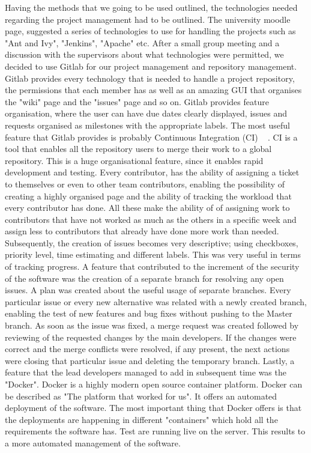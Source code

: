 \documentclass{l3proj}
\begin{document}
Having the methods that we going to be used outlined, the technologies needed regarding the project management had to be outlined. The university moodle page, suggested a series of technologies to use for handling the projects such as "Ant and Ivy", "Jenkins", "Apache" etc. After a small group meeting and a discussion with the supervisors about what technologies were permitted, we decided to use Gitlab for our project management and repository management. Gitlab provides every technology that is needed to handle a project repository, the permissions that each member has as well as an amazing GUI that organises the "wiki" page and the "issues" page and so on. Gitlab provides feature organisation, where the user can have due dates clearly displayed, issues and requests organised as milestones with the appropriate labels. The most useful feature that Gitlab provides is probably Continuous Integration (CI) ~\cite{ci} . CI is a tool that enables all the repository users to merge their work to a global repository. This is a huge organisational feature, since it enables rapid development and testing. Every contributor, has the ability of assigning a ticket to themselves or even to other team contributors, enabling the possibility of creating a highly organised page and the ability of tracking the workload that every contributor has done. All these make the ability of of assigning work to contributors that have not worked as much as the others in a specific week and assign less to contributors that already have done more work than needed. Subsequently, the creation of issues becomes very descriptive; using checkboxes, priority level, time estimating and different labels. This was very useful in terms of tracking progress. A feature that contributed to the increment of the security of the software was the creation of a separate branch for resolving any open issues. A plan was created about the useful usage of separate branches. Every particular issue or every new alternative was related with a newly created branch, enabling the test of new features and bug fixes without pushing to the Master branch. As soon as the issue was fixed, a merge request was created followed by reviewing of the requested changes by the main developers. If the changes were correct and the merge conflicts were resolved, if any present, the next actions were closing that particular issue and deleting the temporary branch. Lastly, a feature that the lead developers managed to add in subsequent time was the "Docker". Docker is a highly modern open source container platform. Docker can be described as "The platform that worked for us". It offers an automated deployment of the software. The most important thing that Docker offers is that the deployments are happening in different "containers" which hold all the requirements the software has. Test are running live on the server. This results to a more automated management of the software.
\end{document}
